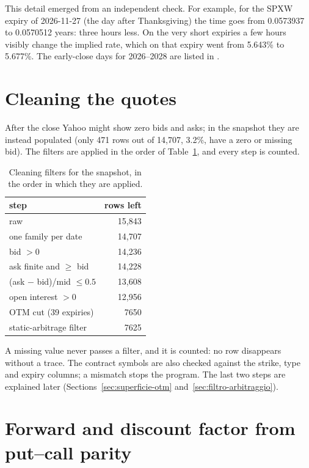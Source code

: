 This detail emerged from an independent check. For example, for the SPXW expiry of \mbox{2026-11-27} (the day after
Thanksgiving) the time goes from 0.0573937 to 0.0570512 years: three hours less. On the very short expiries a few
hours visibly change the implied rate, which on that expiry went from 5.643\% to 5.677\%. The early-close days for
2026--2028 are listed in .

\section{Cleaning the quotes}
After the close Yahoo might show zero bids and asks; in the snapshot they are instead populated (only 471 rows out
of 14{,}707, 3.2\%, have a zero or missing bid). The filters are applied in the order of Table~\ref{tab:filtri}, and
every step is counted.

\begin{table}[htbp]
\centering
\small
\caption{Cleaning filters for the snapshot, in the order in which they are applied.}
\label{tab:filtri}
\begin{tabular}{@{}lr@{}}
\toprule
step & rows left\\
\midrule
raw & 15{,}843\\
one family per date & 14{,}707\\
bid $>0$ & 14{,}236\\
ask finite and $\ge$ bid & 14{,}228\\
(ask $-$ bid)/mid $\le0.5$ & 13{,}608\\
open interest $>0$ & 12{,}956\\
OTM cut (39 expiries) & 7650\\
static-arbitrage filter & 7625\\
\bottomrule
\end{tabular}
\end{table}

A missing value never passes a filter, and it is counted: no row disappears without a trace. The contract symbols
are also checked against the strike, type and expiry columns; a mismatch stops the program. The last two steps are
explained later (Sections~\ref{sec:superficie-otm} and~\ref{sec:filtro-arbitraggio}).

\section{Forward and discount factor from put--call parity}
